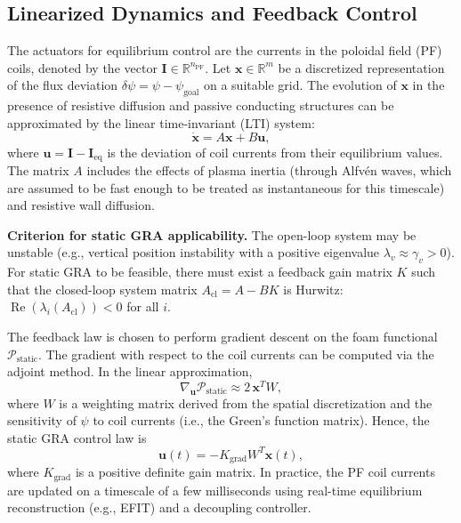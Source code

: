 \documentclass[12pt,a4paper]{article}
\begin{document}
\subsection{Linearized Dynamics and Feedback Control}

The actuators for equilibrium control are the currents in the poloidal field (PF) coils, denoted by the vector $\mathbf{I} \in \mathbb{R}^{n_{\text{PF}}}$. Let $\mathbf{x} \in \mathbb{R}^{m}$ be a discretized representation of the flux deviation $\delta\psi = \psi - \psi_{\text{goal}}$ on a suitable grid. The evolution of $\mathbf{x}$ in the presence of resistive diffusion and passive conducting structures can be approximated by the linear time-invariant (LTI) system:
\begin{equation}
\dot{\mathbf{x}} = A \mathbf{x} + B \mathbf{u},
\label{eq:linear}
\end{equation}
where $\mathbf{u} = \mathbf{I} - \mathbf{I}_{\text{eq}}$ is the deviation of coil currents from their equilibrium values. The matrix $A$ includes the effects of plasma inertia (through Alfvén waves, which are assumed to be fast enough to be treated as instantaneous for this timescale) and resistive wall diffusion.

\textbf{Criterion for static GRA applicability.} The open-loop system may be unstable (e.g., vertical position instability with a positive eigenvalue $\lambda_v \approx \gamma_v > 0$). For static GRA to be feasible, there must exist a feedback gain matrix $K$ such that the closed-loop system matrix $A_{\text{cl}} = A - BK$ is Hurwitz: $\operatorname{Re}(\lambda_i(A_{\text{cl}})) < 0$ for all $i$.

The feedback law is chosen to perform gradient descent on the foam functional $\mathcal{P}_{\text{static}}$. The gradient with respect to the coil currents can be computed via the adjoint method. In the linear approximation,
\begin{equation}
\nabla_{\mathbf{u}} \mathcal{P}_{\text{static}} \approx 2\, \mathbf{x}^T W,
\end{equation}
where $W$ is a weighting matrix derived from the spatial discretization and the sensitivity of $\psi$ to coil currents (i.e., the Green's function matrix). Hence, the static GRA control law is
\begin{equation}
\mathbf{u}(t) = -K_{\text{grad}} W^T \mathbf{x}(t),
\label{eq:static_control}
\end{equation}
where $K_{\text{grad}}$ is a positive definite gain matrix. In practice, the PF coil currents are updated on a timescale of a few milliseconds using real-time equilibrium reconstruction (e.g., EFIT) and a decoupling controller.
\end{document}
